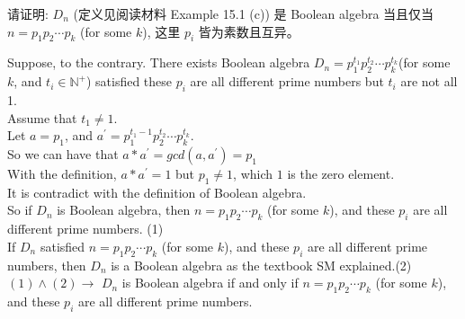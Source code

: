 \documentclass[a4paper, justified]{tufte-handout}
\begin{document}
\begin{solution}
\end{solution}

\beginot


% 



\begincorrection
\begin{problem}[$D_{n}$1-13.2]
请证明: $D_{n}$ (定义见阅读材料 Example 15.1 (c))
是 Boolean algebra 当且仅当 $n = p_1 p_2 \cdots p_k$ (for some $k$),
这里 $p_i$ 皆为素数且互异。
\end{problem}

\begin{solution}
  Suppose, to the contrary. There exists  Boolean algebra $D_{n}= p_1^{t_1} p_2^{t_2} \cdots p_k^{t_k}$(for some $k$, and $t_{i}\in \mathbb{N^{+}}$) satisfied these $p_i$ are all different prime numbers but $t_{i}$ are not all 1.\\
  Assume that $t_1\neq 1$.\\
  Let $a=p_1$, and $a^{\prime}= p_1^{t_1-1} p_2^{t_2} \cdots p_k^{t_k}$.\\
  So we can have that $a*a^{\prime}=gcd(a,a^{\prime})=p_1$\\
  With the definition, $a*a^{\prime}=1$ but $p_1\neq 1$, which $1$ is the zero element.\\
  It is contradict with the definition of Boolean algebra.\\
  So if $D_{n}$ is Boolean algebra, then $n = p_1 p_2 \cdots p_k$ (for some $k$), and  these $p_i$ are all different prime numbers. \hfill(1)\\
  If $D_{n}$ satisfied $n = p_1 p_2 \cdots p_k$ (for some $k$), and  these $p_i$ are all different prime numbers,  then $D_{n}$ is a Boolean algebra as the textbook SM explained.\hfill(2)\\
  $(1)\land (2)\to$ $D_{n}$ is Boolean algebra if and only if $n = p_1 p_2 \cdots p_k$ (for some $k$), and  these $p_i$ are all different prime numbers.
\end{solution}
\end{document}
